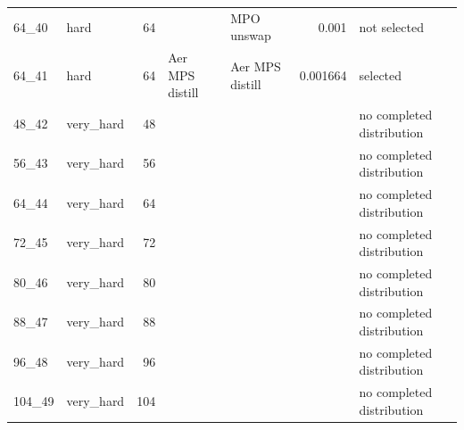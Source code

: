 \begin{longtable}{l l r l l r l}
64\_40 & hard & 64 &  & MPO unswap & 0.001 & not selected \\
64\_41 & hard & 64 & Aer MPS distill & Aer MPS distill & 0.001664 & selected \\
48\_42 & very\_hard & 48 &  &  &  & no completed distribution \\
56\_43 & very\_hard & 56 &  &  &  & no completed distribution \\
64\_44 & very\_hard & 64 &  &  &  & no completed distribution \\
72\_45 & very\_hard & 72 &  &  &  & no completed distribution \\
80\_46 & very\_hard & 80 &  &  &  & no completed distribution \\
88\_47 & very\_hard & 88 &  &  &  & no completed distribution \\
96\_48 & very\_hard & 96 &  &  &  & no completed distribution \\
104\_49 & very\_hard & 104 &  &  &  & no completed distribution \\
\bottomrule
\end{longtable}
\normalsize
